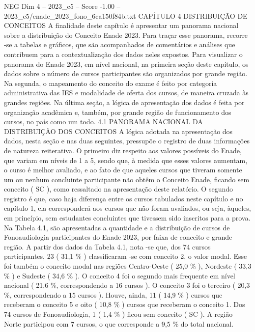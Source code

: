 \begin{textsample}{NEG Dim 4 – 2023\_c5 – Score -1.00 – 2023\_c5/enade\_2023\_fono\_6ca150f84b.txt}  \label{ex:f4_neg_099}
CAPÍTULO 4 DISTRIBUIÇÃO DE CONCEITOS A finalidade deste capítulo é apresentar um panorama nacional sobre a distribuição do Conceito Enade 2023.
Para traçar esse panorama, recorre -se a tabelas e gráficos, que são acompanhados de comentários e análises que contribuem para a contextualização dos dados neles expostos.
Para visualizar o panorama do Enade 2023, em nível nacional, na primeira seção deste capítulo, os dados sobre o número de cursos participantes são organizados por grande região.
Na segunda, o mapeamento do conceito do exame é feito por categoria administrativa das IES e modalidade de oferta dos cursos, de maneira cruzada às grandes regiões.
Na última seção, a lógica de apresentação dos dados é feita por organização acadêmica e, também, por grande região de funcionamento dos cursos, no país como um todo. 4.1 PANORAMA NACIONAL DA DISTRIBUIÇÃO DOS CONCEITOS A lógica adotada na apresentação dos dados, nesta seção e nas duas seguintes, pressupõe o registro de duas informações de natureza reiterativa.
O primeiro diz respeito aos valores possíveis do Enade, que variam em níveis de 1 a 5, sendo que, à medida que esses valores aumentam, o curso é melhor avaliado, e ao fato de que aqueles cursos que tiveram somente um ou nenhum concluinte participante não obtêm o Conceito Enade, ficando sem conceito ( SC ), como ressaltado na apresentação deste relatório.
O segundo registro é que, caso haja diferença entre os cursos tabulados neste capítulo e no capítulo 1, ela corresponderá aos cursos que não foram avaliados, ou seja, àqueles, em princípio, sem estudantes concluintes que tivessem sido inscritos para a prova.
Na Tabela 4.1, são apresentadas a quantidade e a distribuição de cursos de Fonoaudiologia participantes do Enade 2023, por faixa de conceito e grande região.
A partir dos dados da Tabela 4.1, nota -se que, dos 74 cursos participantes, 23 ( 31,1 \% ) classificaram -se com conceito 2, o valor modal.
Esse foi também o conceito modal nas regiões Centro-Oeste ( 25,0 \% ), Nordeste ( 33,3 \% ) e Sudeste ( 34,6 \% ).
O conceito 4 foi o segundo mais frequente em nível nacional ( 21,6 \%, correspondendo a 16 cursos ).
O conceito 3 foi o terceiro ( 20,3 \%, correspondendo a 15 cursos ).
Houve, ainda, 11 ( 14,9 \% ) cursos que receberam o conceito 5 e oito ( 10,8 \% ) cursos que receberam o conceito 1.
Dos 74 cursos de Fonoaudiologia, 1 ( 1,4 \% ) ficou sem conceito ( SC ).
A região Norte participou com 7 cursos, o que corresponde a 9,5 \% do total nacional.

\end{textsample}

